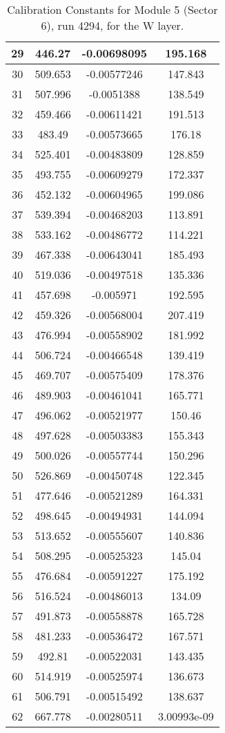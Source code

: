 \begin{table}[h]
{\begin{tabular}{|c|c|c|c|}
29	&	446.27	&	-0.00698095	&	195.168	\\	\hline
30	&	509.653	&	-0.00577246	&	147.843	\\	\hline
31	&	507.996	&	-0.0051388	&	138.549	\\	\hline
32	&	459.466	&	-0.00611421	&	191.513	\\	\hline
33	&	483.49	&	-0.00573665	&	176.18	\\	\hline
34	&	525.401	&	-0.00483809	&	128.859	\\	\hline
35	&	493.755	&	-0.00609279	&	172.337	\\	\hline
36	&	452.132	&	-0.00604965	&	199.086	\\	\hline
37	&	539.394	&	-0.00468203	&	113.891	\\	\hline
38	&	533.162	&	-0.00486772	&	114.221	\\	\hline
39	&	467.338	&	-0.00643041	&	185.493	\\	\hline
40	&	519.036	&	-0.00497518	&	135.336	\\	\hline
41	&	457.698	&	-0.005971	&	192.595	\\	\hline
42	&	459.326	&	-0.00568004	&	207.419	\\	\hline
43	&	476.994	&	-0.00558902	&	181.992	\\	\hline
44	&	506.724	&	-0.00466548	&	139.419	\\	\hline
45	&	469.707	&	-0.00575409	&	178.376	\\	\hline
46	&	489.903	&	-0.00461041	&	165.771	\\	\hline
47	&	496.062	&	-0.00521977	&	150.46	\\	\hline
48	&	497.628	&	-0.00503383	&	155.343	\\	\hline
49	&	500.026	&	-0.00557744	&	150.296	\\	\hline
50	&	526.869	&	-0.00450748	&	122.345	\\	\hline
51	&	477.646	&	-0.00521289	&	164.331	\\	\hline
52	&	498.645	&	-0.00494931	&	144.094	\\	\hline
53	&	513.652	&	-0.00555607	&	140.836	\\	\hline
54	&	508.295	&	-0.00525323	&	145.04	\\	\hline
55	&	476.684	&	-0.00591227	&	175.192	\\	\hline
56	&	516.524	&	-0.00486013	&	134.09	\\	\hline
57	&	491.873	&	-0.00558878	&	165.728	\\	\hline
58	&	481.233	&	-0.00536472	&	167.571	\\	\hline
59	&	492.81	&	-0.00522031	&	143.435	\\	\hline
60	&	514.919	&	-0.00525974	&	136.673	\\	\hline
61	&	506.791	&	-0.00515492	&	138.637	\\	\hline
62	&	667.778	&	-0.00280511	&	3.00993e-09	\\	\hline
              \end{tabular}
        }
        \caption{Calibration Constants for Module 5 (Sector 6), run 4294, for the W layer.}
\end{table}

